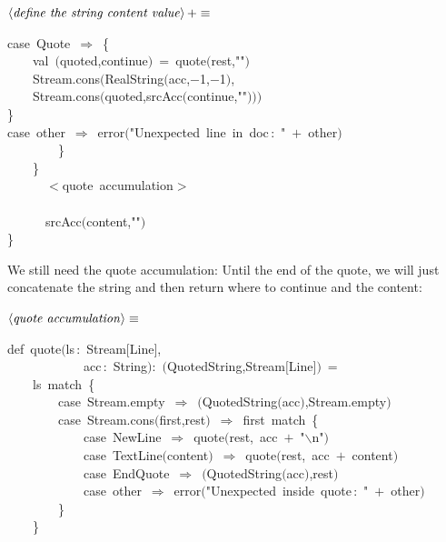 \documentclass[a4paper,12pt]{article}
\begin{document}
$\left<\mbox{\emph{define the string content value}}\right>+\equiv$
\begin{program}{\vem case}~Quote~$\Rightarrow$~{\small\{}
\\~~~~{\vem val}~$($quoted,continue$)$~=~quote$($rest,""$)$
\\~~~~Stream.cons$($RealString$($acc,$-$1,$-$1$)$,
\\~~~~Stream.cons$($quoted,srcAcc$($continue,""$)$$)$$)$
\\{\small\}}
\\{\vem case}~other~$\Rightarrow$~error$($"Unexpected~line~in~doc\,{\rm :}~"~$+$~other$)$
\\~~~~~~~~{\small\}}
\\~~~~{\small\}}
\\[0.5em]~~~~~~$<$quote~accumulation$>$
\\~~~~~~~~
\\~~~~~~srcAcc$($content,""$)$
\\{\small\}}
\\[0.5em]\end{program}
We still need the quote accumulation: Until the end of the quote, we
will just concatenate the string and then return where to continue and
the content:

$\left<\mbox{\emph{quote accumulation}}\right>\equiv$
\begin{program}{\vem def}~quote$($ls\,{\rm :}~Stream$[$Line$]$,
\\~~~~~~~~~~~~acc\,{\rm :}~String$)${\rm :}~$($QuotedString,Stream$[$Line$]$$)$~=
\\~~~~ls~{\vem match}~{\small\{}
\\~~~~~~~~{\vem case}~Stream.empty~$\Rightarrow$~$($QuotedString$($acc$)$,Stream.empty$)$
\\~~~~~~~~{\vem case}~Stream.cons$($first,rest$)$~$\Rightarrow$~first~{\vem match}~{\small\{}
\\~~~~~~~~~~~~{\vem case}~NewLine~$\Rightarrow$~quote$($rest,~acc~$+$~"$\backslash$n"$)$
\\~~~~~~~~~~~~{\vem case}~TextLine$($content$)$~$\Rightarrow$~quote$($rest,~acc~$+$~content$)$
\\~~~~~~~~~~~~{\vem case}~EndQuote~$\Rightarrow$~$($QuotedString$($acc$)$,rest$)$
\\~~~~~~~~~~~~{\vem case}~other~$\Rightarrow$~error$($"Unexpected~inside~quote\,{\rm :}~"~$+$~other$)$
\\~~~~~~~~{\small\}}
\\~~~~{\small\}}
\\[0.5em]\end{program}
\end{document}
